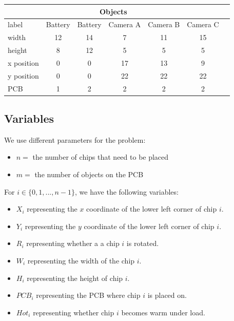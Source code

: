             \begin{table}[h]
                \centering
                \begin{tabular}{l|cccccc}
                \toprule
                \multicolumn{6}{c}{Objects} \\
                \midrule
                label      & Battery & Battery & Camera A & Camera B  & Camera C \\
                width      & 12 & 14 & 7 & 11  & 15 \\
                height     & 8 & 12 & 5 & 5 & 5 \\
                x position & 0 & 0 & 17 & 13 & 9 \\
                y position & 0 & 0 & 22 & 22 & 22 \\
                PCB        & 1 & 2 & 2 & 2  & 2 \\
                \bottomrule
                \end{tabular}
            \end{table}

    \subsection{Variables}

        We use different parameters for the problem:
        
        \begin{itemize}
            \item $n=$ the number of chips that need to be placed
            \item $m = $ the number of objects on the PCB
        \end{itemize}

        For $i \in \{0, 1, ..., n-1\}$, we have the following variables:
        \begin{itemize}
            \item $X_i$ representing the $x$ coordinate of the lower left corner
                of chip $i$.
            \item $Y_i$ representing the $y$ coordinate of the lower left corner
                of chip $i$.
            \item $R_i$ representing whether a a chip $i$ is rotated.
            \item $W_i$ representing the width of the chip $i$.
            \item $H_i$ representing the height of chip $i$.
            \item $PCB_i$ representing the PCB where chip $i$ is placed on.
            \item $Hot_i$ representing whether chip $i$ becomes warm under load.
        \end{itemize}

